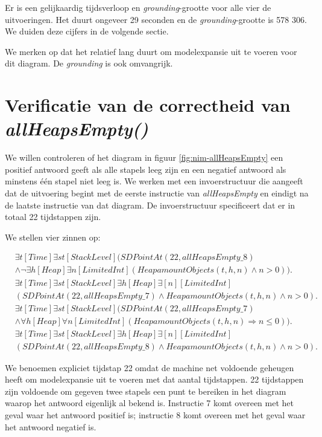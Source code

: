 Er is een gelijkaardig tijdsverloop en \textit{grounding}-grootte voor alle vier de uitvoeringen. Het duurt ongeveer 29 seconden en de \textit{grounding}-grootte is 578 306. We duiden deze cijfers in de volgende sectie.

We merken op dat het relatief lang duurt om modelexpansie uit te voeren voor dit diagram. De \textit{grounding} is ook omvangrijk.

\section{Verificatie van de correctheid van \textit{allHeapsEmpty()}}

We willen controleren of het diagram in figuur \ref{fig:nim-allHeapsEmpty} een positief antwoord geeft als alle stapels leeg zijn en een negatief antwoord als minstens \'e\'en stapel niet leeg is. We werken met een invoerstructuur die aangeeft dat de uitvoering begint met de eerste instructie van \textit{allHeapsEmpty} en eindigt na de laatste instructie van dat diagram. De invoerstructuur specificeert dat er in totaal 22 tijdstappen zijn.

We stellen vier zinnen op:

\begin{align}
	\nonumber&\exists{t}[Time]\exists{st}[StackLevel](SDPointAt(22, allHeapsEmpty\_8) \\ &\land \lnot\exists{h}[Heap]\exists{n}[LimitedInt](HeapamountObjects(t, h, n) \land n > 0)).\label{form:ahe_fnonempty} \\
	\nonumber&\exists{t}[Time]\exists{st}[StackLevel]\exists{h}[Heap]\exists[n][LimitedInt] \\ &(SDPointAt(22, allHeapsEmpty\_7) \land HeapamountObjects(t, h, n) \land n > 0).\label{form:ahe_fempty} \\
	\nonumber&\exists{t}[Time]\exists{st}[StackLevel](SDPointAt(22, allHeapsEmpty\_7) \\ &\land \forall{h}[Heap]\forall{n}[LimitedInt](HeapamountObjects(t, h, n) \Rightarrow n \leq 0)).\label{form:ahe_cempty} \\
	\nonumber&\exists{t}[Time]\exists{st}[StackLevel]\exists{h}[Heap]\exists[n][LimitedInt] \\ &(SDPointAt(22, allHeapsEmpty\_8) \land HeapamountObjects(t, h, n) \land n > 0).\label{form:ahe_cnonempty}
\end{align}

We benoemen expliciet tijdstap 22 omdat de machine net voldoende geheugen heeft om modelexpansie uit te voeren met dat aantal tijdstappen. 22 tijdstappen zijn voldoende om gegeven twee stapels een punt te bereiken in het diagram waarop het antwoord eigenlijk al bekend is. Instructie 7 komt overeen met het geval waar het antwoord positief is; instructie 8 komt overeen met het geval waar het antwoord negatief is.

